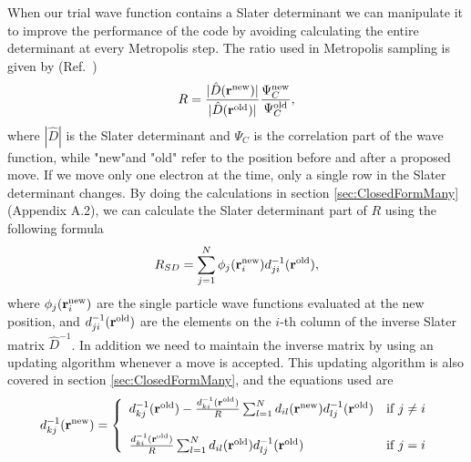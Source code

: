 \documentclass[../main.tex]{subfiles}
\begin{document}
When our trial wave function contains a Slater determinant we can manipulate it to improve the performance of the code by avoiding calculating the entire determinant at every Metropolis step. The ratio used in Metropolis sampling is given by (Ref.~\cite{FYS4411-Slides})
\begin{align}
    R = \frac{|\hat{D}({\bf r}^{\textrm{new}})|}{|\hat{D}({\bf r}^{\textrm{old}})|} \frac{\Psi_C^{\textrm{new}}}{\Psi_C^{\textrm{old}}},
\end{align}
where $|\hat{D}|$ is the Slater determinant and $\Psi_C$ is the correlation part of the wave function, while "new"and "old" refer to the position before and after a proposed move. If we move only one electron at the time, only a single row in the Slater determinant changes. By doing the calculations in section \ref{sec:ClosedFormMany}(Appendix A.2), we can calculate the Slater determinant part of $R$ using the following formula
\begin{align}\label{eq:MetropolisRatioSD}
    R_{SD} = \sum_{j=1}^N \phi_j({\bf r}_i^{\textrm{new}}) d_{ji}^{-1}({\bf r}^{\textrm{old}}),
\end{align}
where $\phi_j({\bf r}_i^{\textrm{new}})$ are the single particle wave functions evaluated at the new position, and $d_{ji}^{-1}({\bf r}^{\textrm{old}})$ are the elements on the $i$-th column of the inverse Slater matrix $\hat{D}^{-1}$. In addition we need to maintain the inverse matrix by using an updating algorithm whenever a move is accepted. This updating algorithm is also covered in section \ref{sec:ClosedFormMany}, and the equations used are 
\begin{align}
    d^{-1}_{kj}(\mathbf{r}^{\textrm{new}}) = \left\{\begin{array}{l l}
  d^{-1}_{kj}(\mathbf{r}^{\textrm{old}}) - \frac{d^{-1}_{ki}(\mathbf{r}^{\textrm{old}})}{R} \sum_{l=1}^{N} d_{il}(\mathbf{r}^{\textrm{new}})  d^{-1}_{lj}(\mathbf{r}^{\textrm{old}}) & \mbox{if $j \neq i$}\nonumber \\ \\
 \frac{d^{-1}_{ki}(\mathbf{r}^{\textrm{old}})}{R} \sum_{l=1}^{N} d_{il}(\mathbf{r}^{\textrm{old}}) d^{-1}_{lj}(\mathbf{r}^{\textrm{old}}) & \mbox{if $j=i$}
\end{array} \right.
\end{align}
\end{document}
